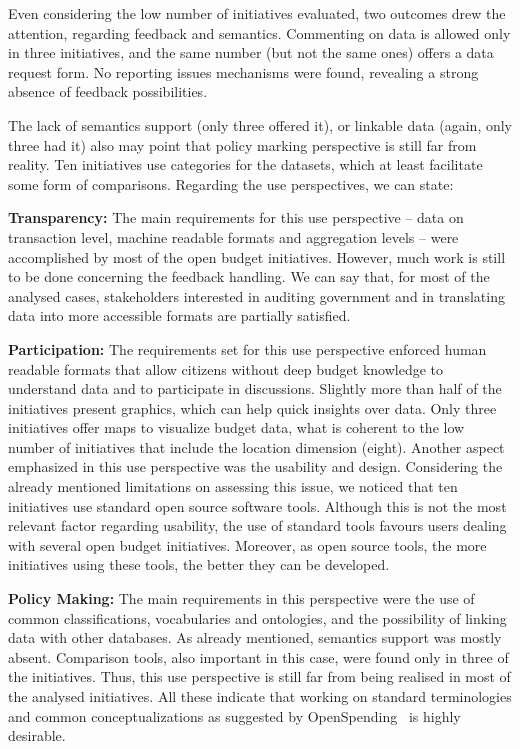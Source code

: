 Even considering the low number of initiatives evaluated, two outcomes drew the attention, regarding feedback and semantics. 
Commenting on data is allowed only in three initiatives, and the same number (but not the same ones) offers a data request form.
No reporting issues mechanisms were found, revealing a strong absence of feedback possibilities.

The lack of semantics support (only three offered it), or linkable data (again, only three had it) also may point that policy marking perspective is still far from reality. 
Ten initiatives use categories for the datasets, which at least facilitate some form of comparisons.
Regarding the use perspectives, we can state:

\noindent\textbf{Transparency:}
The main requirements for this use perspective -- data on transaction level, machine readable formats and aggregation levels -- were accomplished by most of the open budget initiatives. 
However, much work is still to be done concerning the feedback handling.
We can say that, for most of the analysed cases, stakeholders interested in auditing government and in translating data into more accessible formats are partially satisfied.

\vspace{.1cm}

\noindent \textbf{Participation:}
The requirements set for this use perspective enforced human readable formats that allow citizens without deep budget knowledge to understand data and to participate in discussions.
Slightly more than half of the initiatives present graphics, which can help quick insights over data.
Only three initiatives offer maps to visualize budget data, what is coherent to the low number of initiatives that include the location dimension (eight).
Another aspect emphasized in this use perspective was the usability and design. 
Considering the already mentioned limitations on assessing this issue, we noticed that ten initiatives use standard open source software tools. 
Although this is not the most relevant factor regarding usability, the use of standard tools favours users dealing with several open budget initiatives.
Moreover, as open source tools, the more initiatives using these tools, the better they can be developed.

\vspace{.1cm}

\noindent \textbf{Policy Making:}
The main requirements in this perspective were the use of common classifications, vocabularies and ontologies, and the possibility of linking data with other databases.
As already mentioned, semantics support was mostly absent. Comparison tools, also important in this case, were found only in three of the initiatives. 
Thus, this use perspective is still far from being realised in most of the analysed initiatives. 
All these indicate that working on standard terminologies and common conceptualizations as suggested by OpenSpending~\cite{OpenSpending} is highly desirable.


